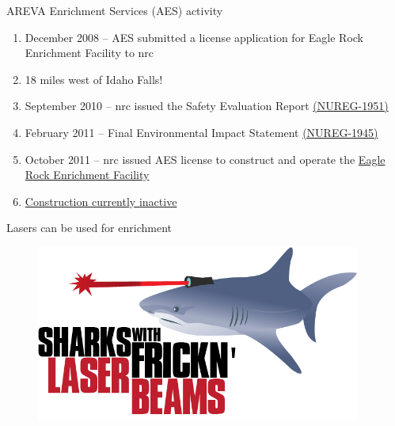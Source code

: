 \documentclass[aspectratio=1610,pdftex,dvipsnames,compress,xcolor={dvipsnames}]{beamer}
\newcommand{\acs}{\acrshort} %
\begin{document}
\begin{frame}{AREVA Enrichment Services (AES) activity}
    \begin{enumerate}[topsep=0pt,itemsep=15pt,leftmargin=*,label=(\arabic*)]
        \item[]December 2008 -- AES submitted a license application for Eagle Rock Enrichment Facility to \acs{nrc}
        \item[]18 miles west of Idaho Falls! 
        \item[]September 2010 -- \acs{nrc} issued the Safety Evaluation Report \href{https://www.nrc.gov/reading-rm/doc-collections/nuregs/staff/sr1951/index.html}{(NUREG-1951)}
        \item[]February 2011 -- Final Environmental Impact Statement \href{https://www.nrc.gov/reading-rm/doc-collections/nuregs/staff/sr1945/index.html}{(NUREG-1945)}
        \item[]October 2011 -- \acs{nrc} issued AES license to construct and operate the \href{http://www.new.areva.com/EN/operations-780/the-eagle-rock-enrichment-facility-enrichment-by-centrifugation.html}{Eagle Rock Enrichment Facility}
        \item[]\href{http://www.wise-uranium.org/epusarc.html}{Construction currently inactive}
    \end{enumerate}
\end{frame}


\begin{frame}{Lasers can be used for enrichment}
    \begin{figure}
        \centering
        \includegraphics[width=0.95\textwidth]{shark.png}
    \end{figure}
\end{frame}
\end{document}
